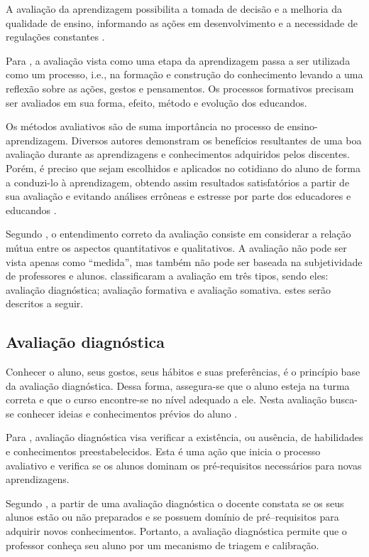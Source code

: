 A avaliação da aprendizagem possibilita a tomada de decisão e a melhoria da qualidade de ensino, informando as ações em desenvolvimento e a necessidade de regulações constantes \cite{kraemer2005avaliaccao}.

Para , a avaliação vista como uma etapa da aprendizagem passa a ser utilizada como um processo, i.e., na formação e construção do conhecimento levando a uma reflexão sobre as ações, gestos e pensamentos. Os processos formativos precisam ser avaliados em sua forma, efeito, método e evolução dos educandos.

Os métodos avaliativos são de suma importância no processo de ensino-aprendizagem. Diversos autores demonstram os benefícios resultantes de uma boa avaliação durante as aprendizagens e conhecimentos adquiridos pelos discentes. Porém, é preciso que sejam escolhidos e aplicados no cotidiano do aluno de forma a conduzi-lo à aprendizagem, obtendo assim resultados satisfatórios a partir de sua avaliação e evitando análises errôneas e estresse por parte dos educadores e educandos \cite{da2014alunos}.

Segundo , o entendimento correto da avaliação consiste em considerar a relação mútua entre os aspectos quantitativos e qualitativos. A avaliação não pode ser vista apenas como ``medida'', mas também não pode ser baseada na subjetividade de professores e alunos.  classificaram a avaliação em três tipos, sendo eles: avaliação diagnóstica; avaliação formativa e avaliação somativa. estes serão descritos a seguir.

\subsection{Avaliação diagnóstica}
\label{sec:AvaDiag}
Conhecer o aluno, seus gostos, seus hábitos e suas preferências, é o princípio base da avaliação diagnóstica. Dessa forma, assegura-se que o aluno esteja na turma correta e que o curso encontre-se no nível adequado a ele. Nesta avaliação busca-se conhecer ideias e conhecimentos prévios do aluno \cite{masetto1994didatica}.

Para , avaliação diagnóstica visa verificar a existência, ou ausência, de habilidades e conhecimentos preestabelecidos. Esta é uma ação que inicia o processo avaliativo e verifica se os alunos dominam os pré‐requisitos necessários para novas aprendizagens.

Segundo , a partir de uma avaliação diagnóstica o docente constata se os seus alunos estão ou não preparados e se possuem domínio de pré–requisitos para adquirir novos conhecimentos. Portanto, a avaliação diagnóstica permite que o professor conheça seu aluno por um mecanismo de triagem e calibração.

